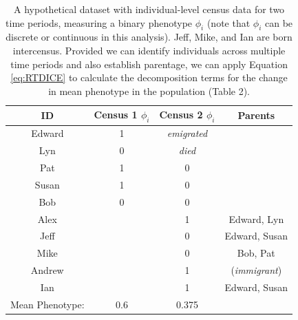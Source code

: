 		\begin{table}[htbp]
    \begin{center}
    \begin{footnotesize}
    \begin{tabular}{cccc}
    \hline
    \hline
    ID    & Census 1 $\phi_i$ & Census 2 $\phi_i$ & Parents \\
    \hline
    Edward & 1     & \textit{emigrated} &  \\
    Lyn   & 0     & \textit{died}  &  \\
    Pat   & 1     & 0     &  \\
    Susan & 1     & 0     &  \\
    Bob   & 0     & 0     &  \\
    Alex      &   & 1     & Edward, Lyn \\
    Jeff      &   & 0     & Edward, Susan \\
    Mike      &    & 0     & Bob, Pat \\
    Andrew      &  & 1     & (\textit{immigrant})\\
    Ian      &     & 1     & Edward, Susan \\
    \hline
		Mean Phenotype: & 0.6 & 0.375 & \\
		\hline
		
	 	\end{tabular}
	  \caption{A hypothetical dataset with individual-level census data for two time periods, measuring a binary phenotype $\phi_i$ (note that $\phi_i$ can be discrete or continuous in this analysis).  Jeff, Mike, and Ian are born intercensus.  Provided we can identify individuals across multiple time periods and also establish parentage, we can apply Equation \ref{eq:RTDICE} to calculate the decomposition terms for the change in mean phenotype in the population (Table 2).}
		\label{tab:DemoData}
		\end{footnotesize}
		\end{center}
		\end{table}


